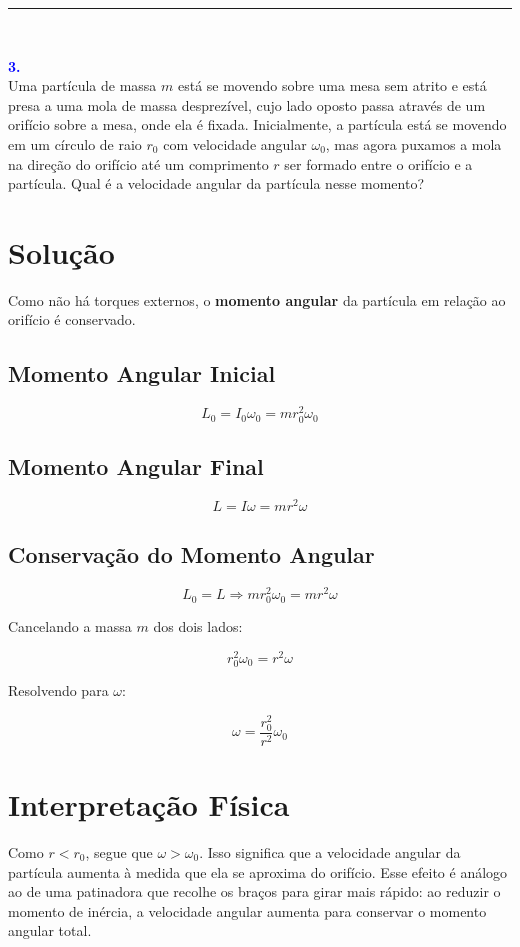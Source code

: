 \documentclass[a4paper,12pt]{article}
\begin{document}
\noindent\rule{\linewidth}{0.4pt}\\

\begin{flushleft}
\textbf{\textcolor{blue}{\Large \textbf{3.}}}\\
Uma partícula de massa \( m \) está se movendo sobre uma mesa sem atrito e está presa a uma mola de massa 
desprezível, cujo lado oposto passa através de um orifício sobre a mesa, onde ela é fixada. 
Inicialmente, a partícula está se movendo em um círculo de raio \( r_0 \) com velocidade angular \( \omega_0 \), 
mas agora puxamos a mola na direção do orifício até um comprimento \( r \) ser formado entre o orifício e a partícula. 
Qual é a velocidade angular da partícula nesse momento?


\vspace{0.5cm}
\section*{Solução}

\colorbox{yellow!20}{Como não há torques externos, o \textbf{momento angular} da partícula em relação ao orifício} 
\colorbox{yellow!20}{é conservado.}

\subsection*{Momento Angular Inicial}

\[
L_0 = I_0 \omega_0 = m r_0^2 \omega_0
\]

\subsection*{Momento Angular Final}

\[
L = I \omega = m r^2 \omega
\]

\subsection*{Conservação do Momento Angular}

\[
L_0 = L \Rightarrow m r_0^2 \omega_0 = m r^2 \omega
\]

Cancelando a massa \( m \) dos dois lados:

\[
r_0^2 \omega_0 = r^2 \omega
\]

Resolvendo para \( \omega \):

\[
\boxed{\omega = \frac{r_0^2}{r^2} \omega_0}
\]

\section*{\colorbox{green!15}{Interpretação Física}}

Como \( r < r_0 \), segue que \( \omega > \omega_0 \). Isso significa que a velocidade angular da partícula aumenta 
à medida que ela se aproxima do orifício. Esse efeito é análogo ao de uma patinadora que recolhe os braços para girar 
mais rápido: \colorbox{yellow!20}{ao reduzir o momento de} \colorbox{yellow!20}{inércia, a velocidade angular aumenta 
para conservar o momento angular total.}

\end{flushleft}
\end{document}
